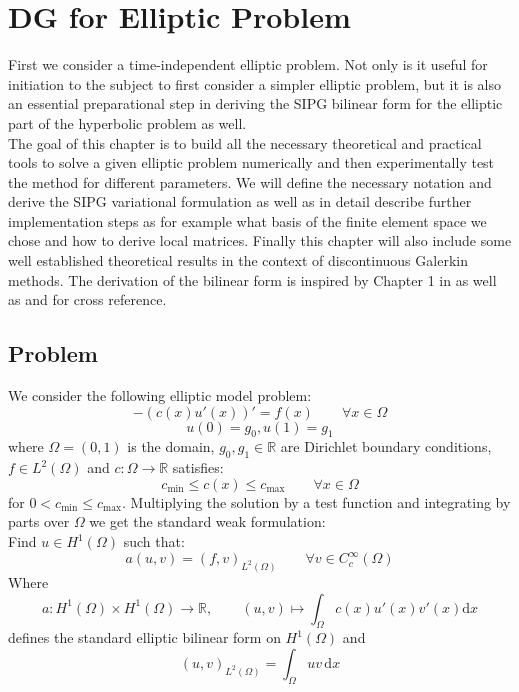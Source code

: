 \chapter{DG for Elliptic Problem}

First we consider a time-independent elliptic problem. Not only is it
useful for initiation to the subject to first consider a simpler elliptic problem, but it
is also an essential preparational step in deriving the SIPG bilinear form for the
elliptic part of the hyperbolic problem as well.
\\
The goal of this chapter is to build all the necessary theoretical and practical
tools to solve a given elliptic problem
numerically and then experimentally test the method for different parameters.
We will define the necessary notation and derive
the SIPG variational formulation as well as in detail describe further implementation steps as
for example what basis of the finite element space we chose and how to derive local matrices.
Finally this chapter will also include some well established theoretical results in
the context of discontinuous Galerkin methods.
The derivation
of the bilinear form is inspired by
Chapter 1 in \cite{riviere2008} as well as \cite{georgoulis2011Springer} and \cite{grote2006}
for cross reference.

\section{Problem}
\label{sec:elliptic_problem}
We consider the following elliptic model problem:
\begin{equation}
	\label{eq:elliptic_pde}
	-(c(x)u'(x))' = f(x) \qquad \forall x\in \Omega
\end{equation}
\begin{equation}
	\label{eq:elliptic_pde_bc}
	u(0) = g_0, u(1) = g_1
\end{equation}
where $\Omega = (0,1)$ is the domain, $g_0, g_1 \in \mathbb{R}$ are
Dirichlet boundary conditions, $f \in L^2(\Omega)$ and $c:\Omega \to \mathbb{R}$
satisfies:
\[
	c_{\min} \leq c(x) \leq c_{\max} \qquad \forall x\in \Omega
\]
for $0 < c_{\min} \leq c_{\max}$.
Multiplying the solution by a test function and integrating by parts over $\Omega$ we get the
standard weak formulation: \\
Find $u \in H^1(\Omega)$ such that:
\begin{equation}
	\label{eq:elliptic_weak_form}
	a(u,v) = (f,v)_{L^2(\Omega)} \qquad \forall v \in C_c^{\infty}(\Omega)
\end{equation}
Where
\[
	a:H^1(\Omega) \times H^1(\Omega) \to \mathbb{R}, \qquad (u,v) \mapsto \int_{\Omega} c(x)u'(x)v'(x) \text{d}x
\]
defines the standard elliptic bilinear form on $H^1(\Omega)$ and
\[
	(u,v)_{L^2(\Omega)} = \int_{\Omega} uv \,\text{d}x
\]

